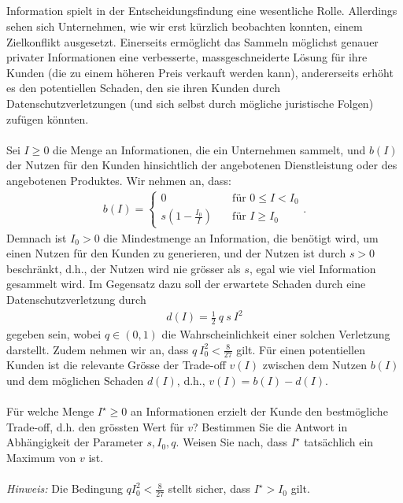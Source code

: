 \subsection*{}
Information spielt in der Entscheidungsfindung eine wesentliche Rolle. Allerdings
sehen sich Unternehmen, wie wir erst kürzlich beobachten konnten, einem Zielkonflikt
ausgesetzt. Einerseits ermöglicht das Sammeln möglichst genauer privater Informationen eine verbesserte, massgeschneiderte Lösung für ihre Kunden (die zu einem höheren Preis verkauft werden kann), andererseits erhöht es den potentiellen Schaden, den sie ihren Kunden durch Datenschutzverletzungen (und sich selbst durch mögliche juristische Folgen) zufügen könnten.\\
\\
Sei $I \geq 0 $ die Menge an Informationen, die ein Unternehmen sammelt, und $b(I)$ der Nutzen für den Kunden hinsichtlich der angebotenen Dienstleistung oder des angebotenen Produktes. Wir nehmen an, dass:
\begin{align*}
	b(I)
	= 
	\begin{cases}
		0 &\quad \textrm{für } 0 \leq I  < I_0\\
		s \left( 1 - \frac{I_0}{I} \right) & \quad \textrm{für } I \geq I_0
	\end{cases}.
\end{align*}
Demnach ist $I_0 > 0 $ die Mindestmenge an Information, die benötigt wird, um einen Nutzen für den Kunden zu generieren, und der Nutzen ist durch $s > 0 $ beschränkt, d.h., der Nutzen wird nie grösser als $s$, egal wie viel Information gesammelt wird. Im Gegensatz dazu soll der erwartete Schaden durch eine Datenschutzverletzung durch
\begin{align*}
	d(I) = \frac{1}{2} \ q \ s  \ I^2
\end{align*}
gegeben sein, wobei $q \in (0,1)$ die Wahrscheinlichkeit einer solchen Verletzung darstellt.
Zudem nehmen wir an, dass $q \  I_0^2 < \frac{8}{27}$ gilt. Für einen potentiellen Kunden ist die relevante Grösse der Trade-off $v(I)$ zwischen dem Nutzen $b(I)$ und dem möglichen Schaden $d(I)$, d.h., $v(I) = b(I) - d(I)$.\\
\\
Für welche Menge $I^\star \geq 0$ an Informationen erzielt der Kunde den bestmögliche Trade-off, d.h. den grössten Wert für $v$?
Bestimmen Sie die Antwort in Abhängigkeit der Parameter $s, I_0, q$.
Weisen Sie nach, dass $I^\star$ tatsächlich ein Maximum von $v$ ist.\\
\\
\textit{Hinweis:} Die Bedingung $q I_0^2 < \frac{8}{27}$ stellt sicher, dass $I^\star > I_0 $ gilt.

